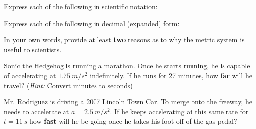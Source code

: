 \begin{questions}
\qsp 

\question[2] Express each of the following in scientific notation:


\qsp

\question[2] Express each of the following in decimal (expanded) form:

\qsp
\question[2] In your own words, provide at least \textbf{two} reasons as to why the metric system is useful to scientists.  

\qspp

\newpage
{}


\question[3] Sonic the Hedgehog is running a marathon. Once he starts running, he is capable of accelerating at $\SI{1.75}{m/s^2}$ indefinitely. If he runs for 27 minutes, how \textbf{far} will he travel? (\emph{Hint:} Convert minutes to seconds)

\qspppp

\question[3] Mr. Rodriguez is driving a 2007 Lincoln Town Car. To merge onto the freeway, he needs to accelerate at $a=\SI{2.5}{m/s^2}$. If he keeps accelerating at this same rate for $t=\SI{11}{s}$ how \textbf{fast} will he be going once he takes his foot off of the gas pedal?


\end{questions}
